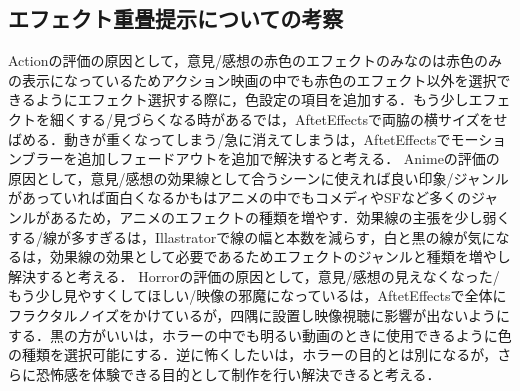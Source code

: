 \subsection{エフェクト重畳提示についての考察}
Actionの評価の原因として，意見/感想の赤色のエフェクトのみなのは赤色のみの表示になっているためアクション映画の中でも赤色のエフェクト以外を選択できるようにエフェクト選択する際に，色設定の項目を追加する．もう少しエフェクトを細くする/見づらくなる時があるでは，AftetEffectsで両脇の横サイズをせばめる．動きが重くなってしまう/急に消えてしまうは，AftetEffectsでモーションブラーを追加しフェードアウトを追加で解決すると考える．
Animeの評価の原因として，意見/感想の効果線として合うシーンに使えれば良い印象/ジャンルがあっていれば面白くなるかもはアニメの中でもコメディやSFなど多くのジャンルがあるため，アニメのエフェクトの種類を増やす．効果線の主張を少し弱くする/線が多すぎるは，Illastratorで線の幅と本数を減らす，白と黒の線が気になるは，効果線の効果として必要であるためエフェクトのジャンルと種類を増やし解決すると考える．
Horrorの評価の原因として，意見/感想の見えなくなった/もう少し見やすくしてほしい/映像の邪魔になっているは，AftetEffectsで全体にフラクタルノイズをかけているが，四隅に設置し映像視聴に影響が出ないようにする．黒の方がいいは，ホラーの中でも明るい動画のときに使用できるように色の種類を選択可能にする．逆に怖くしたいは，ホラーの目的とは別になるが，さらに恐怖感を体験できる目的として制作を行い解決できると考える．